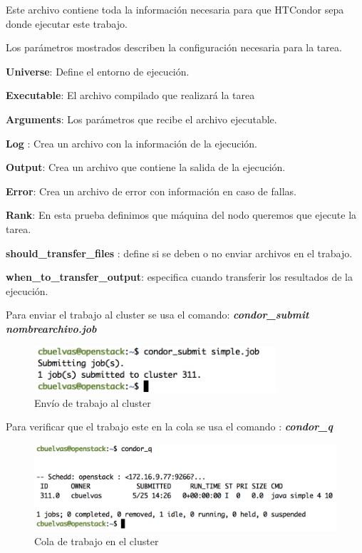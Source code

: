 Este archivo contiene toda la información necesaria para que HTCondor sepa donde ejecutar este trabajo. 

Los parámetros mostrados describen la configuración necesaria para la tarea.

\textbf{Universe}: Define el entorno de ejecución.

\textbf{Executable}: El archivo compilado que realizará la tarea 

\textbf{Arguments}: Los parámetros que recibe el archivo ejecutable.

\textbf{Log} : Crea un archivo con la información de la ejecución.

\textbf{Output}: Crea un archivo que contiene la salida de la ejecución.

\textbf{Error}: Crea un archivo de error con información en caso de fallas.

\textbf{Rank}: En esta prueba definimos que máquina del nodo queremos que ejecute la tarea.

\textbf{should\_transfer\_files} : define si se deben o no enviar archivos en el trabajo.

\textbf{when\_to\_transfer\_output}: especifica cuando transferir los resultados de la ejecución.

Para enviar el trabajo al cluster se usa el comando: \textit{\textbf{condor\_submit nombrearchivo.job}}

\begin{figure}[h]
\centering
\includegraphics[width=0.8\textwidth]{images/submit.png}
\decoRule
\caption{Envío de trabajo al cluster}
\label{fig:condor submit}
\end{figure}
\FloatBarrier

Para verificar que el trabajo este en la cola se usa el comando : \textit{\textbf{condor\_q}}

\begin{figure}[h]
\centering
\includegraphics[width=1\textwidth]{images/condorq.png}
\decoRule
\caption{Cola de trabajo en el cluster}
\label{fig:condorq}
\end{figure}
\FloatBarrier

